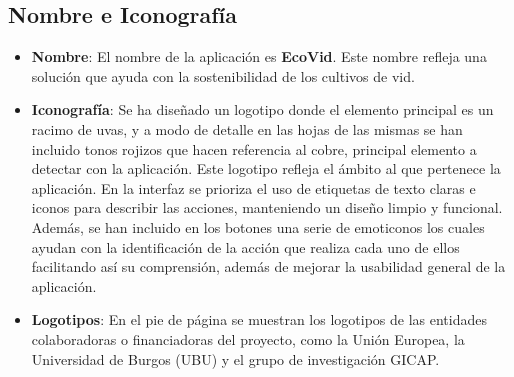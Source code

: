 \subsection{Nombre e Iconografía}
\begin{itemize}
    \item \textbf{Nombre}: El nombre de la aplicación es \textbf{EcoVid}. Este nombre refleja una solución que ayuda con la sostenibilidad de los cultivos de vid. 

    \item \textbf{Iconografía}: Se ha diseñado un logotipo donde el elemento principal es un racimo de uvas, y a modo de detalle en las hojas de las mismas se han incluido tonos rojizos que hacen referencia al cobre, principal elemento a detectar con la aplicación. Este logotipo refleja el ámbito al que pertenece la aplicación.  En la interfaz se prioriza el uso de etiquetas de texto claras e iconos para describir las acciones, manteniendo un diseño limpio y funcional. Además, se han incluido en los botones una serie de emoticonos los cuales ayudan con la identificación de la acción que realiza cada uno de ellos facilitando así su comprensión, además de mejorar la usabilidad general de la aplicación.

    \item \textbf{Logotipos}: En el pie de página se muestran los logotipos de las entidades colaboradoras o financiadoras del proyecto, como la Unión Europea, la Universidad de Burgos (UBU) y el grupo de investigación GICAP. 
\end{itemize}



